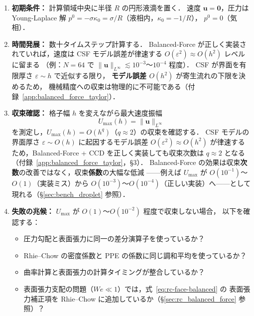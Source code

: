 \begin{tcolorbox}[algbox, title={静止液滴テスト：Balanced-Force の検証手順}]
\begin{enumerate}
  \item \textbf{初期条件：} 計算領域中央に半径 $R$ の円形液滴を置く．
        速度 $\bm{u} = \bm{0}$，圧力は Young-Laplace 解
        $p^0 = -\sigma\kappa_0 = \sigma/R$（液相内，$\kappa_0 = -1/R$），
        $p^0 = 0$（気相）．

  \item \textbf{時間発展：} 数十タイムステップ計算する．
        Balanced-Force が正しく実装されていれば，速度は CSF モデル誤差が律速する
        $O(\varepsilon^2) \approx O(h^2)$ レベルに留まる
        （例：$N=64$ で $\|\bm{u}\|_{L^\infty} \lesssim 10^{-3}$〜$10^{-4}$ 程度）．
        CSF が界面を有限厚さ $\varepsilon \sim h$ で近似する限り，
        \textbf{モデル誤差 $O(h^2)$} が寄生流れの下限を決めるため，
        機械精度への収束は物理的に不可能である（付録~\ref{app:balanced_force_taylor}）．

  \item \textbf{収束確認：} 格子幅 $h$ を変えながら最大速度振幅
        \[
          U_{\mathrm{max}}(h) = \|\bm{u}\|_{L^\infty}
        \]
        を測定し，$U_{\mathrm{max}}(h) = O(h^q)$（$q \approx 2$）の収束を確認する．
        CSF モデルの界面厚さ $\varepsilon \sim O(h)$ に起因するモデル誤差 $O(\varepsilon^2) \approx O(h^2)$
        が律速するため，Balanced-Force + CCD を正しく実装しても収束次数は $q \approx 2$ となる
        （付録~\ref{app:balanced_force_taylor}，§3）．
        Balanced-Force の効果は収束\textbf{次数}の改善ではなく，収束\textbf{係数}の大幅な低減
        ——例えば $U_{\mathrm{max}}$ が $O(10^{-1})$〜$O(1)$（実装ミス）から
        $O(10^{-3})$〜$O(10^{-4})$（正しい実装）へ——として現れる（§\ref{sec:bench_droplet} 参照）．

  \item \textbf{失敗の兆候：} $U_{\mathrm{max}}$ が $O(1)$〜$O(10^{-2})$ 程度で収束しない場合，
        以下を確認する：
        \begin{itemize}
          \item 圧力勾配と表面張力に同一の差分演算子を使っているか？
          \item Rhie--Chow の密度係数と PPE の係数に同じ調和平均を使っているか？
          \item 曲率計算と表面張力の計算タイミングが整合しているか？
          \item 表面張力支配の問題（$We \ll 1$）では，式~\eqref{eq:rc-face-balanced} の
                表面張力補正項を Rhie--Chow に追加しているか（§\ref{sec:rc_balanced_force} 参照）？
        \end{itemize}
\end{enumerate}
\end{tcolorbox}
